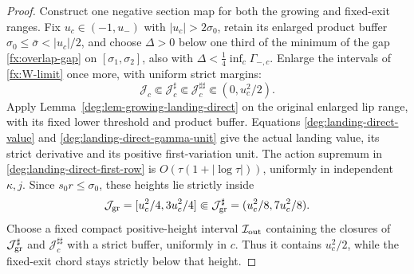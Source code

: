\begin{proof}
Construct one negative section map for both the growing and fixed-exit
ranges. Fix \(u_c\in(-1,u_-)\) with \(|u_c|>2\sigma_0\), retain
its enlarged product buffer \(\sigma_0\le\bar\sigma<|u_c|/2\), and choose
\(\Delta>0\) below one third of the minimum of the gap
\eqref{fx:overlap-gap} on \([\sigma_1,\sigma_2]\), also with
\(\Delta<\frac14\inf_c\Gamma_{-,c}\). Enlarge the intervals of
\eqref{fx:W-limit} once more, with uniform strict margins:
\[
 \mathcal J_c\Subset\mathcal J_c^\sharp
 \Subset\mathcal J_c^{\sharp\sharp}\Subset(0,u_c^2/2).
\]
Apply Lemma~\ref{deg:lem-growing-landing-direct} on the original
enlarged lip range, with its fixed lower threshold and product buffer.
Equations \eqref{deg:landing-direct-value} and
\eqref{deg:landing-direct-gamma-unit} give the actual landing value,
its strict derivative and its positive first-variation unit.
The action supremum in \eqref{deg:landing-direct-first-row} is
$O(\tau(1+|\log\tau|))$, uniformly in independent $\kappa,j$.
Since \(s_0r\le\sigma_0\), these heights lie strictly inside
\[
 \mathcal J_{\rm gr}=[u_c^2/4,3u_c^2/4]
 \Subset\mathcal J_{\rm gr}^{\sharp}=(u_c^2/8,7u_c^2/8).
\]
Choose a fixed compact positive-height interval \(\mathcal I_{\rm out}\)
containing the closures of \(\mathcal J_{\rm gr}^{\sharp}\) and
\(\mathcal J_c^{\sharp\sharp}\) with a strict buffer, uniformly in
\(c\). Thus it contains \(u_c^2/2\), while the fixed-exit chord
stays strictly below that height.


\end{proof}
